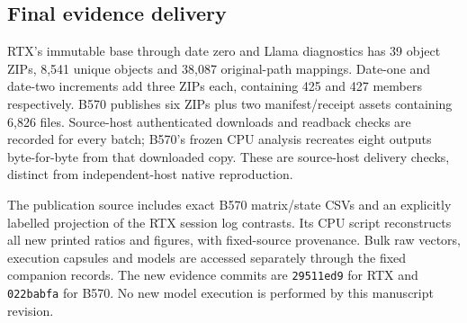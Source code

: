 \subsection{Final evidence delivery}
RTX's immutable base through date zero and Llama diagnostics has 39 object ZIPs, 8,541 unique objects and 38,087 original-path mappings. Date-one and date-two increments add three ZIPs each, containing 425 and 427 members respectively. B570 publishes six ZIPs plus two manifest/receipt assets containing 6,826 files. Source-host authenticated downloads and readback checks are recorded for every batch; B570's frozen CPU analysis recreates eight outputs byte-for-byte from that downloaded copy. These are source-host delivery checks, distinct from independent-host native reproduction.

The publication source includes exact B570 matrix/state CSVs and an explicitly labelled projection of the RTX session log contrasts. Its CPU script reconstructs all new printed ratios and figures, with fixed-source provenance. Bulk raw vectors, execution capsules and models are accessed separately through the fixed companion records. The new evidence commits are \texttt{29511ed9} for RTX and \texttt{022babfa} for B570. No new model execution is performed by this manuscript revision.
